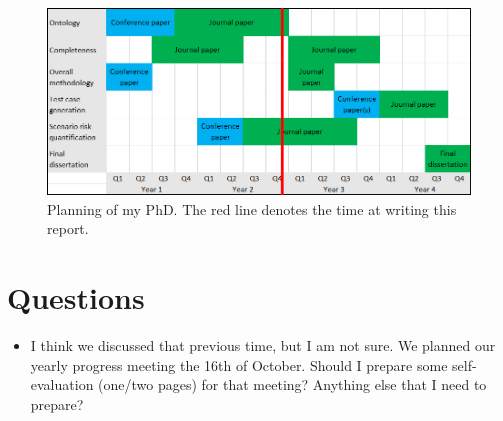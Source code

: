 \documentclass[10pt,final,a4paper,oneside,onecolumn]{article}
\begin{document}
\begin{figure}
	\includegraphics[width=\linewidth]{planning}
	\caption{Planning of my PhD. The red line denotes the time at writing this report.}
	\label{fig:planning}
\end{figure}

\section{Questions}

\begin{itemize}
	\item I think we discussed that previous time, but I am not sure. We planned our yearly progress meeting the 16th of October. Should I prepare some self-evaluation (one/two pages) for that meeting? Anything else that I need to prepare?
\end{itemize}


\printbibliography

%
\end{document}
